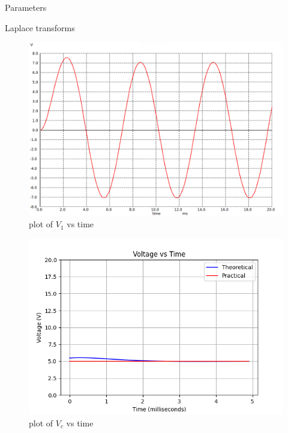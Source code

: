 \documentclass[journal,12pt,twocolumn]{IEEEtran}
\begin{document}
\begin{table}[ht]
    \begin{adjustbox}{width=\columnwidth}
       
    \end{adjustbox}
    \caption{Parameters}
    \label{tab:Gate.ee.54.1}

\end{table}


\begin{table}[ht]
    
    \caption{Laplace transforms}
    \label{tab:Gate.ee.54.2}
\end{table}

\begin{figure}[htbp]
    \centering
    \includegraphics[width=\columnwidth]{2023/EE/54/figs/fig1.png}
    \caption{plot of $V_1$ vs time}
\end{figure}

\begin{figure}[htbp]
    \centering
    \includegraphics[width=\columnwidth]{2023/EE/54/figs/fig3.png}
    \caption{plot of $V_c$ vs time}
\end{figure}

\end{document}
